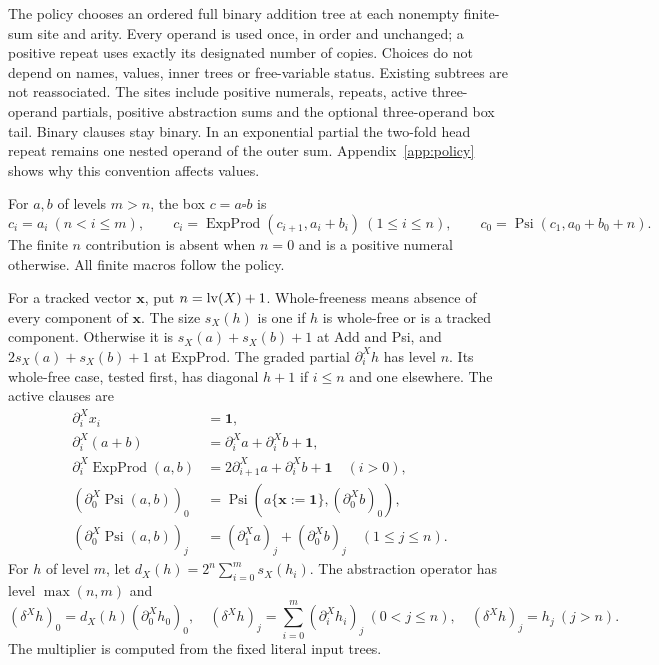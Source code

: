 The policy chooses an ordered full binary addition tree at each
nonempty finite-sum site and arity. Every operand is used once, in
order and unchanged; a positive repeat uses exactly its designated
number of copies. Choices do not depend on names, values, inner trees
or free-variable status. Existing subtrees are not reassociated.
The sites include positive numerals, repeats, active three-operand
partials, positive abstraction sums and the optional three-operand
box tail. Binary clauses stay binary. In an exponential partial the
two-fold head repeat remains one nested operand of the outer sum.
Appendix~\ref{app:policy} shows why this convention affects values.

For $a,b$ of levels $m>n$, the box $c=a\square b$ is
\[
 c_i=a_i\ (n<i\le m),\qquad
 c_i=\operatorname{ExpProd}(c_{i+1},a_i+b_i)\ (1\le i\le n),
 \qquad c_0=\operatorname{Psi}(c_1,a_0+b_0+n).
\]
The finite $n$ contribution is absent when $n=0$ and is a positive
numeral otherwise. All finite macros follow the policy.

For a tracked vector $\mathbf x$, put $n=\operatorname{lv}(X)+1$. Whole-freeness
means absence of every component of $\mathbf x$. The size
$s_X(h)$ is one if $h$ is whole-free or is a tracked component.
Otherwise it is $s_X(a)+s_X(b)+1$ at Add and Psi, and
$2s_X(a)+s_X(b)+1$ at ExpProd. The graded partial
$\partial_i^Xh$ has level $n$. Its whole-free case, tested first,
has diagonal $h+1$ if $i\le n$ and one elsewhere. The active clauses are
\begin{align*}
 \partial_i^Xx_i&=\mathbf1,\\
 \partial_i^X(a+b)&=\partial_i^Xa+\partial_i^Xb+\mathbf1,\\
 \partial_i^X\operatorname{ExpProd}(a,b)
      &=2\partial_{i+1}^Xa+\partial_i^Xb+\mathbf1\quad(i>0),\\
 (\partial_0^X\operatorname{Psi}(a,b))_0
      &=\operatorname{Psi}(a\{\mathbf x:=\mathbf1\},(\partial_0^Xb)_0),\\
 (\partial_0^X\operatorname{Psi}(a,b))_j
      &=(\partial_1^Xa)_j+(\partial_0^Xb)_j\quad(1\le j\le n).
\end{align*}
For $h$ of level $m$, let $d_X(h)=2^n\sum_{i=0}^m s_X(h_i)$.
The abstraction operator has level $\max(n,m)$ and
\[
 (\delta^Xh)_0=d_X(h)(\partial_0^Xh_0)_0,\quad
 (\delta^Xh)_j=\sum_{i=0}^m(\partial_i^Xh_i)_j\ (0<j\le n),
 \quad(\delta^Xh)_j=h_j\ (j>n).
\]
The multiplier is computed from the fixed literal input trees.

